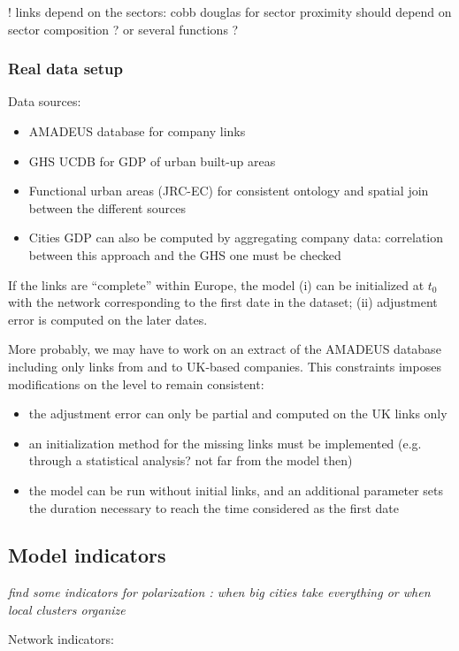 \documentclass{article}
\begin{document}
! links depend on the sectors: cobb douglas for sector proximity should depend on sector composition ? or several functions ?


\subsubsection{Real data setup}

Data sources:
\begin{itemize}
	\item AMADEUS database for company links
	\item GHS UCDB for GDP of urban built-up areas
	\item Functional urban areas (JRC-EC) for consistent ontology and spatial join between the different sources
	\item Cities GDP can also be computed by aggregating company data: correlation between this approach and the GHS one must be checked
\end{itemize}

If the links are ``complete'' within Europe, the model (i) can be initialized at $t_0$ with the network corresponding to the first date in the dataset; (ii) adjustment error is computed on the later dates.

More probably, we may have to work on an extract of the AMADEUS database including only links from and to UK-based companies. This constraints imposes modifications on the level to remain consistent:
\begin{itemize}
    \item the adjustment error can only be partial and computed on the UK links only
    \item an initialization method for the missing links must be implemented (e.g. through a statistical analysis? not far from the model then)
    \item the model can be run without initial links, and an additional parameter sets the duration necessary to reach the time considered as the first date
\end{itemize}




\subsection{Model indicators}

\textit{find some indicators for polarization : when big cities take everything or when local clusters organize}

Network indicators:
\end{document}
